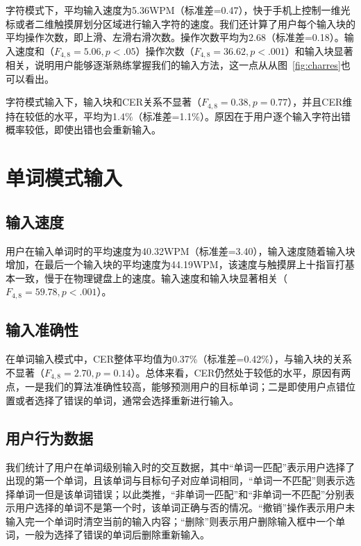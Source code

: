 字符模式下，平均输入速度为5.36WPM（标准差=0.47），快于手机上控制一维光标或者二维触摸屏划分区域进行输入字符的速度\cite{2018forceboard}\cite{1dhandwriting}。我们还计算了用户每个输入块的平均操作次数，即上滑、左滑右滑次数。操作次数平均为2.68（标准差=0.18）。输入速度和（$F_{4,8}=5.06, p < .05$）操作次数（$F_{4,8}=36.62, p < .001$）和输入块显著相关，说明用户能够逐渐熟练掌握我们的输入方法，这一点从从图~\ref{fig:charres}也可以看出。

字符模式输入下，输入块和CER关系不显著（$F_{4,8}=0.38, p =0.77$），并且CER维持在较低的水平，平均为1.4\%（标准差=1.1\%）。原因在于用户逐个输入字符出错概率较低，即使出错也会重新输入。

\section{单词模式输入}

\subsection{输入速度}
用户在输入单词时的平均速度为40.32WPM（标准差=3.40），输入速度随着输入块增加，在最后一个输入块的平均速度为44.19WPM，该速度与触摸屏上十指盲打基本一致\cite{2018shitoast}，慢于在物理键盘上的速度。输入速度和输入块显著相关（$F_{4,8}=59.78, p < .001$）。

\subsection{输入准确性}

在单词输入模式中，CER整体平均值为0.37\%（标准差=0.42\%），与输入块的关系不显著（$F_{4,8}=2.70, p =0.14$）。总体来看，CER仍然处于较低的水平，原因有两点，一是我们的算法准确性较高，能够预测用户的目标单词；二是即使用户点错位置或者选择了错误的单词，通常会选择重新进行输入。

\subsection{用户行为数据}
我们统计了用户在单词级别输入时的交互数据，其中“单词一匹配”表示用户选择了出现的第一个单词，且该单词与目标句子对应单词相同，“单词一不匹配”则表示选择单词一但是该单词错误；以此类推，“非单词一匹配”和“非单词一不匹配”分别表示用户选择的单词不是第一个时，该单词正确与否的情况。“撤销”操作表示用户未输入完一个单词时清空当前的输入内容；“删除”则表示用户删除输入框中一个单词，一般为选择了错误的单词后删除重新输入。

